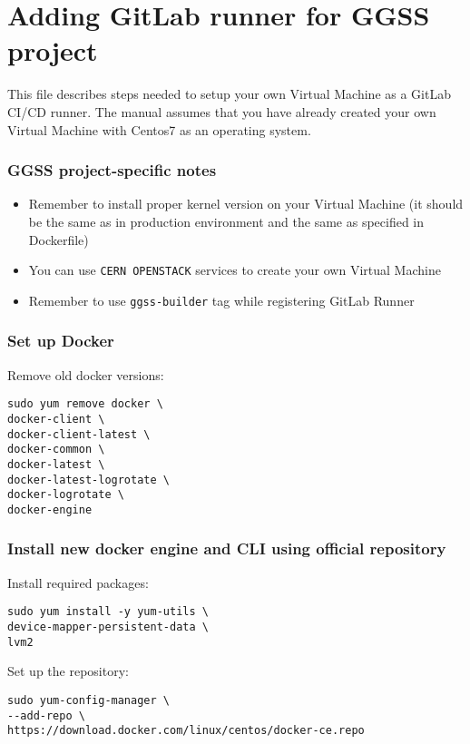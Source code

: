 \section{Adding GitLab runner for GGSS project}
This file describes steps needed to setup your own Virtual Machine as a GitLab CI/CD runner. The manual assumes that you have already created your own Virtual Machine with Centos7 as an operating system.

\subsubsection*{GGSS project-specific notes}

\begin{itemize}
    \item Remember to install proper kernel version on your Virtual Machine (it should be the same as in production environment and the same as specified in Dockerfile)
    \item You can use \lstinline{CERN OPENSTACK} services to create your own Virtual Machine
    \item Remember to use \lstinline{ggss-builder} tag while registering GitLab Runner
\end{itemize}

\subsubsection*{Set up Docker}

\noindent
Remove old docker versions:
\begin{lstlisting}
sudo yum remove docker \
docker-client \
docker-client-latest \
docker-common \
docker-latest \
docker-latest-logrotate \
docker-logrotate \
docker-engine
\end{lstlisting}

\subsubsection*{Install new docker engine and CLI using official repository}

\noindent
Install required packages:
\begin{lstlisting}
sudo yum install -y yum-utils \
device-mapper-persistent-data \
lvm2
\end{lstlisting}

\noindent
Set up the repository:
\begin{lstlisting}
sudo yum-config-manager \
--add-repo \
https://download.docker.com/linux/centos/docker-ce.repo
\end{lstlisting}

